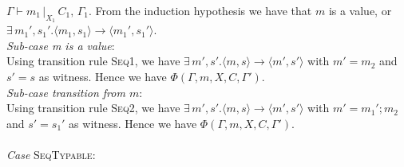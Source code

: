 \documentclass[a4paper, english]{article}
\begin{document}
	$\Gamma \vdash m_1 \, |_X_1\,  C_1, \, \Gamma_1$.
	From the induction hypothesis we have that $m$ is a value, or 
	$\exists \, m_1',s_1'. \langle m_1,s_1\rangle \rightarrow \langle m_1',s_1' \rangle$. \\
	\textit{Sub-case m is a value}: \\
	Using transition rule \textsc{Seq1}, we have 
	$\exists \, m',s'. \langle m,s\rangle \rightarrow \langle m',s' \rangle$
	with $m'=m_2$ and $s'=s$ as witness. Hence we have 
	$\Phi(\Gamma, m, X, C, \Gamma') $. \\
	\textit{Sub-case transition from $m$}: \\
	Using transition rule \textsc{Seq2}, we have 
	$\exists \, m',s'. \langle m,s\rangle \rightarrow \langle m',s' \rangle$
	with $m'=m_1';m_2$ and $s'=s_1'$ as witness. Hence we have 
	$\Phi(\Gamma, m, X, C, \Gamma') $.
\\ \\
	\textit{Case} \textsc{SeqTypable}:\\
\end{document}
